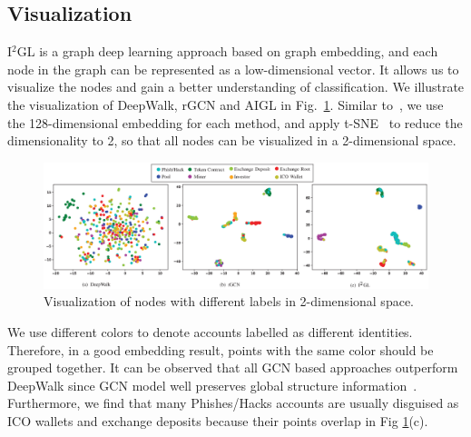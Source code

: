 \subsection{Visualization}
I$^2$GL is a graph deep learning approach based on graph embedding, and each node in the graph can be represented as a low-dimensional vector. It allows us to visualize the nodes and gain a better understanding of classification. We illustrate the visualization of DeepWalk, rGCN and AIGL in Fig.~\ref{fig:visualization}. Similar to~\cite{wang2016structural}, we use the 128-dimensional embedding for each method, and apply t-SNE~\cite{maaten2008visualizing} to reduce the dimensionality to 2, so that all nodes can be visualized in a 2-dimensional space.
\begin{figure}
	\setlength{\tabcolsep}{-5pt}
  \centering
	\includegraphics[width=\textwidth]{fig/visualization}
	\caption{Visualization of nodes with different labels in 2-dimensional space.}
	\label{fig:visualization}
\end{figure}


We use different colors to denote accounts labelled as different identities. Therefore, in a good embedding result, points with the same color should be grouped together. It can be observed that all GCN based approaches outperform DeepWalk since GCN model well preserves global structure information~\cite{goyal2018graph}. Furthermore, we find that many Phishes/Hacks accounts are usually disguised as ICO wallets and exchange deposits because their points overlap in Fig \ref{fig:visualization}(c).


